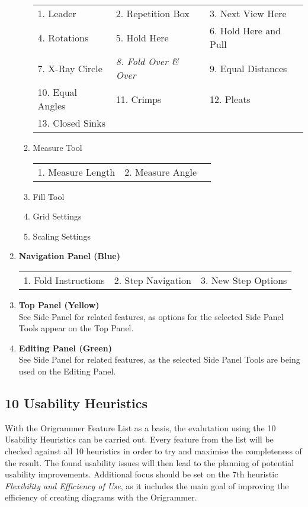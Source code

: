 \begin{enumerate}
\begin{enumerate}
\begin{tabular}{l l l}
        1. Leader & 2. Repetition Box & 3. Next View Here \\
        4. Rotations & 5. Hold Here & 6. Hold Here and Pull \\
        7. X-Ray Circle & \emph{8. Fold Over \& Over}\footnotemark & 9. Equal Distances \\
        10. Equal Angles & 11. Crimps & 12. Pleats \\
        13. Closed Sinks
        \end{tabular}
        \item Measure Tool \\
        \begin{tabular}{l l l}
        1. Measure Length & 2. Measure Angle \\
        \end{tabular}
        \item Fill Tool
        \item Grid Settings
        \item Scaling Settings
    \end{enumerate}
\item \textbf{Navigation Panel (Blue)} \\
\begin{tabular}{l l l}
1. Fold Instructions & 2. Step Navigation & 3. New Step Options \\
\end{tabular}
\item \textbf{Top Panel (Yellow)} \\
See Side Panel for related features, as options for the selected Side Panel Tools appear on the Top Panel.
\item \textbf{Editing Panel (Green)} \\
See Side Panel for related features, as the selected Side Panel Tools are being used on the Editing Panel.
\end{enumerate}
\onehalfspacing

\subsection{10 Usability Heuristics}
\label{sec:usabilityHeuristics}

With the Origrammer Feature List as a basis, the evalutation using the 10 Usability Heuristics can be carried out. Every feature from the list will be checked against all 10 heuristics in order to try and maximise the completeness of the result. The found usability issues will then lead to the planning of potential usability improvements. Additional focus should be set on the 7th heuristic \emph{Flexibility and Efficiency of Use}, as it includes the main goal of improving the efficiency of creating diagrams with the Origrammer.





